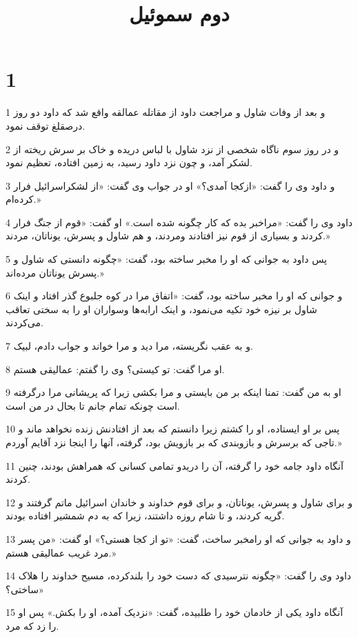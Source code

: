 

\title{دوم سموئيل}

 
\chapter{1}

\par 1 و بعد از وفات شاول و مراجعت داود از مقاتله عمالقه واقع شد که داود دو روز درصقلغ توقف نمود.
\par 2 و در روز سوم ناگاه شخصی از نزد شاول با لباس دریده و خاک بر سرش ریخته از لشکر آمد، و چون نزد داود رسید، به زمین افتاده، تعظیم نمود.
\par 3 و داود وی را گفت: «ازکجا آمدی؟» او در جواب وی گفت: «از لشکراسرائیل فرار کرده‌ام.»
\par 4 داود وی را گفت: «مراخبر بده که کار چگونه شده است.» او گفت: «قوم از جنگ فرار کردند و بسیاری از قوم نیز افتادند ومردند، و هم شاول و پسرش، یوناتان، مردند.»
\par 5 پس داود به جوانی که او را مخبر ساخته بود، گفت: «چگونه دانستی که شاول و پسرش یوناتان مرده‌اند.»
\par 6 و جوانی که او را مخبر ساخته بود، گفت: «اتفاق مرا در کوه جلبوع گذر افتاد و اینک شاول بر نیزه خود تکیه می‌نمود، و اینک ارابه‌ها وسواران او را به سختی تعاقب می‌کردند.
\par 7 و به عقب نگریسته، مرا دید و مرا خواند و جواب دادم، لبیک.
\par 8 او مرا گفت: تو کیستی؟ وی را گفتم: عمالیقی هستم.
\par 9 او به من گفت: تمنا اینکه بر من بایستی و مرا بکشی زیرا که پریشانی مرا در‌گرفته است چونکه تمام جانم تا بحال در من است.
\par 10 پس بر او ایستاده، او را کشتم زیرا دانستم که بعد از افتادنش زنده نخواهد ماند و تاجی که برسرش و بازوبندی که بر بازویش بود، گرفته، آنها را اینجا نزد آقایم آوردم.»
\par 11 آنگاه داود جامه خود را گرفته، آن را دریدو تمامی کسانی که همراهش بودند، چنین کردند.
\par 12 و برای شاول و پسرش، یوناتان، و برای قوم خداوند و خاندان اسرائیل ماتم گرفتند و گریه کردند، و تا شام روزه داشتند، زیرا که به دم شمشیر افتاده بودند.
\par 13 و داود به جوانی که او رامخبر ساخت، گفت: «تو از کجا هستی؟» او گفت: «من پسر مرد غریب عمالیقی هستم.»
\par 14 داود وی را گفت: «چگونه نترسیدی که دست خود را بلندکرده، مسیح خداوند را هلاک ساختی؟»
\par 15 آنگاه داود یکی از خادمان خود را طلبیده، گفت: «نزدیک آمده، او را بکش.» پس او را زد که مرد.
